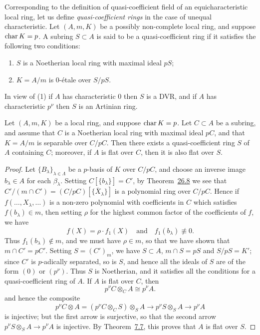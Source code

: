Corresponding to the definition of quasi-coefficient field of an
equicharacteristic local ring, let us define \emph{quasi-coefficient rings} in the case of
unequal characteristic. Let $(A, m, K)$ be a possibly non-complete local ring, and
suppose $\operatorname{char} K = p$. A subring $S \subset A$ is said to be a quasi-coefficient ring if
it satisfies the following two conditions:
\begin{enumerate}[(1)]
  \item $S$ is a Noetherian local ring with maximal ideal $pS$;
  \item $K = A/m$ is 0-\'etale over $S/pS$.
\end{enumerate}
In view of (1) if $A$ has characteristic $0$ then $S$ is a DVR, and if $A$ has
characteristic $p^\nu$ then $S$ is an Artinian ring.

\begin{theorem}\label{thm:29.6}
Let $(A, m, K)$ be a local ring, and suppose $\operatorname{char} K = p$. Let $C \subset A$ be a
subring, and assume that $C$ is a Noetherian local ring with maximal ideal $pC$,
and that $K = A/m$ is separable over $C/pC$. Then there exists a quasi-coefficient
ring $S$ of $A$ containing $C$; moreover, if $A$ is flat over $C$, then it is also
flat over $S$.
\end{theorem}

\begin{proof}
Let $\{B_\lambda\}_{\lambda \in \Lambda}$ be a $p$-basis of $K$ over $C/pC$, and choose an inverse
image $b_\lambda \in A$ for each $\beta_\lambda$. Setting $C[\{b_\lambda\}] = C'$, by
Theorem~\hyperref[thm:26.8]{26.8} we see that $C'/(m \cap C') = (C/pC)[\{\bar{X}_\lambda\}]$ is a
polynomial ring over $C/pC$. Hence if $f(\ldots, X_\lambda, \ldots)$ is a non-zero
polynomial with coefficients in $C$ which satisfies $f(b_\lambda) \in m$, then setting
$\rho$ for the highest common factor of the coefficients of $f$, we have
\[
  f(X) = \rho \cdot f_1(X) \quad \text{and} \quad f_1(b_\lambda) \not\equiv 0.
\]
Thus $f_1(b_\lambda) \notin m$, and we must have $\rho \in m$, so that we have shown that
$m \cap C' = pC'$. Setting $S = (C')_{m}$, we have $S \subset A$, $m \cap S = pS$ and
$S/pS = K'$; since $C'$ is $p$-adically separated, so is $S$, and hence all the
ideals of $S$ are of the form $(0)$ or $(p^\nu)$. Thus $S$ is Noetherian, and it
satisfies all the conditions for a quasi-coefficient ring of $A$. If $A$ is flat over
$C$, then
\[
  p^\nu C \otimes_C A \cong p^\nu A.
\]
and hence the composite
\[
  p^\nu C \otimes A = (p^\nu C \otimes_C S) \otimes_S A \to p^\nu S \otimes_S A \to p^\nu A
\]
is injective; but the first arrow is surjective, so that the second arrow
$p^\nu S \otimes_S A \to p^\nu A$ is injective. By Theorem~\hyperref[thm:7.7]{7.7}, this proves that $A$ is
flat over $S$.
\end{proof}

